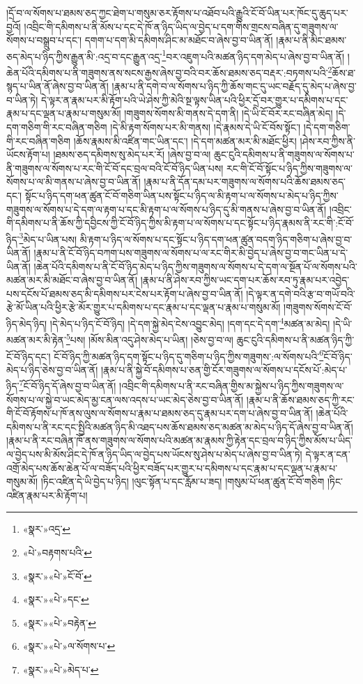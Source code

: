 །དྲོ་བ་ལ་སོགས་པ་ཐམས་ཅད་ཀྱང་ཐེག་པ་གསུམ་ཅར་རྟོགས་པ་འཐོབ་པའི་རྒྱུའི་ངོ་བོ་ཡིན་པར་ཁོང་དུ་ཆུད་པར་བྱའོ། །འབྲིང་གི་དམིགས་པ་ནི་མོས་པ་དང་དེ་ཁོ་ན་ཉིད་ཡིད་ལ་བྱེད་པ་དག་གིས་གྲངས་བཞིན་དུ་གཟུགས་ལ་སོགས་པ་བསྒྲུབ་པ་དང་། དགག་པ་དག་མི་དམིགས་ཤིང་མ་མཐོང་བ་ཞེས་བྱ་བ་ཡིན་ནོ། །རྣམ་པ་ནི་མིང་ཐམས་ཅད་མེད་པ་ཉིད་ཀྱིས་རྒྱུན་མི་:འདྲ་བ་དང་རྒྱུན་འདྲ་\footnote{«སྣར་»འདྲ་}བར་འཇུག་པའི་མཚན་ཉིད་དག་མེད་པ་ཞེས་བྱ་བ་ཡིན་ནོ། །ཆེན་པོའི་དམིགས་པ་ནི་གཟུགས་ནས་སངས་རྒྱས་ཞེས་བྱ་བའི་བར་ཆོས་ཐམས་ཅད་བརྡར་:བཏགས་པའི་\footnote{«པེ་»བརྟགས་པའི་}ཆོས་ཐ་སྙད་པ་ཡིན་ནོ་ཞེས་བྱ་བ་ཡིན་ནོ། །རྣམ་པ་ནི་དགེ་བ་ལ་སོགས་པ་ཉིད་ཀྱི་ཆོས་གང་དུ་ཡང་བརྗོད་དུ་མེད་པ་ཞེས་བྱ་བ་ཡིན་ཏེ། དེ་ལྟར་ན་རྣམ་པར་མི་རྟོག་པའི་ཡེ་ཤེས་ཀྱི་མེའི་སྔ་ལྟས་ཡིན་པའི་ཕྱིར་དྲོ་བར་གྱུར་པ་དམིགས་པ་དང་རྣམ་པ་དང་ལྡན་པ་རྣམ་པ་གསུམ་མོ། །གཟུགས་སོགས་མི་གནས་དེ་དག་ནི། །དེ་ཡི་ངོ་བོར་རང་བཞིན་མེད། །དེ་དག་གཅིག་གི་རང་བཞིན་གཅིག །དེ་མི་རྟག་སོགས་པར་མི་གནས། །དེ་རྣམས་དེ་ཡི་ངོ་བོས་སྟོང་། །དེ་དག་གཅིག་གི་རང་བཞིན་གཅིག །ཆོས་རྣམས་མི་འཛིན་གང་ཡིན་དང་། །དེ་དག་མཚན་མར་མི་མཐོང་ཕྱིར། །ཤེས་རབ་ཀྱིས་ནི་ཡོངས་རྟོག་པ། །ཐམས་ཅད་དམིགས་སུ་མེད་པར་རོ། །ཞེས་བྱ་བ་ལ། ཆུང་ངུའི་དམིགས་པ་ནི་གཟུགས་ལ་སོགས་པ་ནི་གཟུགས་ལ་སོགས་པ་རང་གི་ངོ་བོ་དང་བྲལ་བའི་ངོ་བོ་ཉིད་ཡིན་པས། རང་གི་ངོ་བོ་སྟོང་པ་ཉིད་ཀྱིས་གཟུགས་ལ་སོགས་པ་ལ་མི་གནས་པ་ཞེས་བྱ་བ་ཡིན་ནོ། །རྣམ་པ་ནི་དོན་དམ་པར་གཟུགས་ལ་སོགས་པའི་ཆོས་ཐམས་ཅད་དང་། སྟོང་པ་ཉིད་དག་ཕན་ཚུན་ངོ་བོ་གཅིག་ཡིན་པས་སྟོང་པ་ཉིད་ལ་མི་རྟག་པ་ལ་སོགས་པ་མེད་པ་ཉིད་ཀྱིས་གཟུགས་ལ་སོགས་པ་དེ་དག་ལ་རྟག་པ་དང་མི་རྟག་པ་ལ་སོགས་པ་ཉིད་དུ་མི་གནས་པ་ཞེས་བྱ་བ་ཡིན་ནོ། །འབྲིང་གི་དམིགས་པ་ནི་ཆོས་ཀྱི་དབྱིངས་ཀྱི་ངོ་བོ་ཉིད་ཀྱིས་མི་རྟག་པ་ལ་སོགས་པ་དང་སྟོང་པ་ཉིད་རྣམས་ནི་རང་གི་:ངོ་བོ་ཉིད་\footnote{«སྣར་»«པེ་»ངོ་བོ་}མེད་པ་ཡིན་པས། མི་རྟག་པ་ཉིད་ལ་སོགས་པ་དང་སྟོང་པ་ཉིད་དག་ཕན་ཚུན་བདག་ཉིད་གཅིག་པ་ཞེས་བྱ་བ་ཡིན་ནོ། །རྣམ་པ་ནི་ངོ་བོ་ཉིད་བཀག་པས་གཟུགས་ལ་སོགས་པ་ལ་རང་གིར་མི་བྱེད་པ་ཞེས་བྱ་བ་གང་ཡིན་པ་དེ་ཡིན་ནོ། །ཆེན་པོའི་དམིགས་པ་ནི་ངོ་བོ་ཉིད་མེད་པ་ཉིད་ཀྱིས་གཟུགས་ལ་སོགས་པ་དེ་དག་ལ་སྔོན་པོ་ལ་སོགས་པའི་མཚན་མར་མི་མཐོང་བ་ཞེས་བྱ་བ་ཡིན་ནོ། །རྣམ་པ་ནི་ཤེས་རབ་ཀྱིས་ཡང་དག་པར་ཆོས་རབ་ཏུ་རྣམ་པར་འབྱེད་པས་དངོས་པོ་ཐམས་ཅད་མི་དམིགས་པར་ངེས་པར་རྟོག་པ་ཞེས་བྱ་བ་ཡིན་ནོ། །དེ་ལྟར་ན་དགེ་བའི་རྩ་བ་གཡོ་བའི་རྩེ་མོ་ཡིན་པའི་ཕྱིར་རྩེ་མོར་གྱུར་པ་དམིགས་པ་དང་རྣམ་པ་དང་ལྡན་པ་རྣམ་པ་གསུམ་མོ། །གཟུགས་སོགས་ངོ་བོ་ཉིད་མེད་ཉིད། །དེ་མེད་པ་ཉིད་ངོ་བོ་ཉིད། །དེ་དག་སྐྱེ་མེད་ངེས་འབྱུང་མེད། །དག་དང་དེ་དག་\footnote{«སྣར་»«པེ་»དང་}མཚན་མ་མེད། །དེ་ཡི་མཚན་མར་མི་རྟེན་\footnote{«སྣར་»«པེ་»བརྟེན་}པས། །མོས་མིན་འདུ་ཤེས་མེད་པ་ཡིན། །ཅེས་བྱ་བ་ལ། ཆུང་ངུའི་དམིགས་པ་ནི་མཚན་ཉིད་ཀྱི་ངོ་བོ་ཉིད་དང་། ངོ་བོ་ཉིད་ཀྱི་མཚན་ཉིད་དག་སྟོང་པ་ཉིད་དུ་གཅིག་པ་ཉིད་ཀྱིས་གཟུགས་:ལ་སོགས་པའི་\footnote{«སྣར་»«པེ་»ལ་སོགས་པ་}ངོ་བོ་ཉིད་མེད་པ་ཉིད་ཅེས་བྱ་བ་ཡིན་ནོ། །རྣམ་པ་ནི་སྐྱེ་བོ་དམིགས་པ་ཅན་གྱི་ངོར་གཟུགས་ལ་སོགས་པ་དངོས་པོ་:མེད་པ་ཉིད་\footnote{«སྣར་»«པེ་»མེད་པ་}ངོ་བོ་ཉིད་དོ་ཞེས་བྱ་བ་ཡིན་ནོ། །འབྲིང་གི་དམིགས་པ་ནི་རང་བཞིན་གྱིས་མ་སྐྱེས་པ་ཉིད་ཀྱིས་གཟུགས་ལ་སོགས་པ་ལ་སྐྱེ་བ་ཡང་མེད་མྱ་ངན་ལས་འདས་པ་ཡང་མེད་ཅེས་བྱ་བ་ཡིན་ནོ། །རྣམ་པ་ནི་ཆོས་ཐམས་ཅད་ཀྱི་རང་གི་ངོ་བོ་རྟོགས་པ་ཁོ་ནས་ལུས་ལ་སོགས་པ་རྣམ་པ་ཐམས་ཅད་དུ་རྣམ་པར་དག་པ་ཞེས་བྱ་བ་ཡིན་ནོ། །ཆེན་པོའི་དམིགས་པ་ནི་རང་དང་སྤྱིའི་མཚན་ཉིད་མི་འཐད་པས་ཆོས་ཐམས་ཅད་མཚན་མ་མེད་པ་ཉིད་དོ་ཞེས་བྱ་བ་ཡིན་ནོ། །རྣམ་པ་ནི་རང་བཞིན་ཁོ་ནས་གཟུགས་ལ་སོགས་པའི་མཚན་མ་རྣམས་ཀྱི་རྟེན་དང་བྲལ་བ་ཉིད་ཀྱིས་མོས་པ་ཡིད་ལ་བྱེད་པས་མི་མོས་ཤིང་དེ་ཁོ་ན་ཉིད་ཡིད་ལ་བྱེད་པས་ཡོངས་སུ་ཤེས་པ་མེད་པ་ཞེས་བྱ་བ་ཡིན་ཏེ། དེ་ལྟར་ན་ངན་འགྲོ་མེད་པས་ཆོས་ཆེན་པོ་ལ་བཟོད་པའི་ཕྱིར་བཟོད་པར་གྱུར་པ་དམིགས་པ་དང་རྣམ་པ་དང་ལྡན་པ་རྣམ་པ་གསུམ་མོ། །ཏིང་འཛིན་དེ་ཡི་བྱེད་པ་ཉིད། །ལུང་སྟོན་པ་དང་རློམ་པ་ཟད། །གསུམ་པོ་ཕན་ཚུན་ངོ་བོ་གཅིག །ཏིང་འཛིན་རྣམ་པར་མི་རྟོག་པ། 